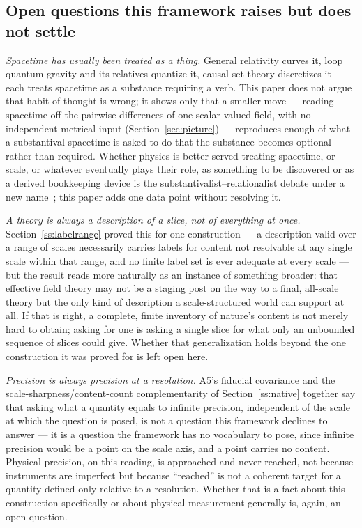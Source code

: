 \documentclass[aps,prd,twocolumn,superscriptaddress,nofootinbib]{revtex4-2}
\begin{document}
\subsection{Open questions this framework raises but does not settle}

\emph{Spacetime has usually been treated as a thing.} General relativity
curves it, loop quantum gravity and its relatives quantize it, causal
set theory discretizes it — each treats spacetime as a substance
requiring a verb. This paper does not argue that habit of thought is
wrong; it shows only that a smaller move — reading spacetime off the
pairwise differences of one scalar-valued field, with no independent
metrical input (Section~\ref{sec:picture}) — reproduces enough of what a
substantival spacetime is asked to do that the substance becomes
optional rather than required. Whether physics is better served treating
spacetime, or scale, or whatever eventually plays their role, as
something to be discovered or as a derived bookkeeping device is the
substantivalist–relationalist debate under a new name~\cite{Earman1989};
this paper adds one data point without resolving it.

\emph{A theory is always a description of a slice, not of everything at
once.} Section~\ref{ss:labelrange} proved this for one construction — a
description valid over a range of scales necessarily carries labels for
content not resolvable at any single scale within that range, and no
finite label set is ever adequate at every scale — but the result reads
more naturally as an instance of something broader: that effective field
theory may not be a staging post on the way to a final, all-scale theory
but the only kind of description a scale-structured world can support at
all. If that is right, a complete, finite inventory of nature's content
is not merely hard to obtain; asking for one is asking a single slice
for what only an unbounded sequence of slices could give. Whether that
generalization holds beyond the one construction it was proved for is
left open here.

\emph{Precision is always precision at a resolution.} A5's fiducial
covariance and the scale-sharpness/content-count complementarity of
Section~\ref{ss:native} together say that asking what a quantity equals
to infinite precision, independent of the scale at which the question is
posed, is not a question this framework declines to answer — it is a
question the framework has no vocabulary to pose, since infinite
precision would be a point on the scale axis, and a point carries no
content. Physical precision, on this reading, is approached and never
reached, not because instruments are imperfect but because ``reached''
is not a coherent target for a quantity defined only relative to a
resolution. Whether that is a fact about this construction specifically
or about physical measurement generally is, again, an open question.
\end{document}
